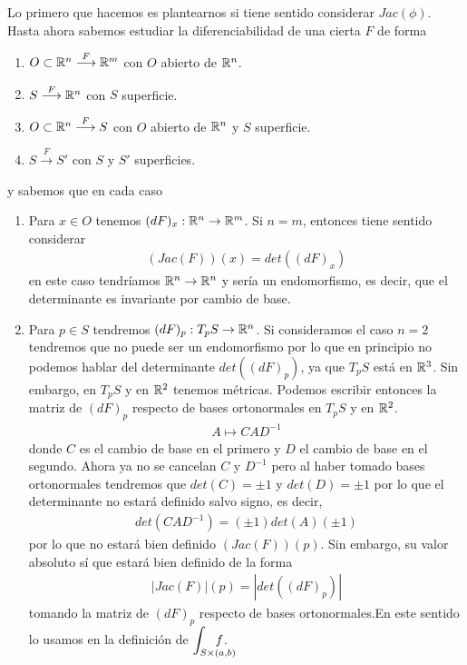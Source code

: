 \begin{observacion}
    Lo primero que hacemos es plantearnos si tiene sentido considerar $Jac(\phi)$. Hasta ahora sabemos estudiar la diferenciabilidad de una cierta $F$ de forma
    \begin{enumerate}
        \item $O \subset \mathbb{R}^n \overset{F}{\longrightarrow} \mathbb{R}^m$ con $O$ abierto de $\mathbb{R}^n$.
        \item $S \overset{F}{\longrightarrow} \mathbb{R}^n$ con $S$ superficie.
        \item $O \subset \mathbb{R}^n \overset{F}{\longrightarrow} S$ con $O$ abierto de $\mathbb{R}^n$ y $S$ superficie.
        \item $S \overset{F}{\longrightarrow} S'$ con $S$ y $S'$ superficies.
    \end{enumerate} 
    y sabemos que en cada caso
    \begin{enumerate}
        \item Para $x\in O$ tenemos $(dF)_x: \mathbb{R}^n \to \mathbb{R}^m$. Si $n=m$, entonces tiene sentido considerar
        \begin{gather*}
            (Jac(F))(x) = det((dF)_x)
        \end{gather*}
        en este caso tendríamos $\mathbb{R}^n \to \mathbb{R}^n$ y sería un endomorfismo, es decir, que el determinante es invariante por cambio de base.

        \item Para $p\in S$ tendremos $(dF)_p : T_pS \to \mathbb{R}^n$. Si consideramos el caso $n=2$ tendremos que no puede ser un endomorfismo por lo que en principio no podemos hablar del determinante $det((dF)_p)$, ya que $T_pS$ está en $\mathbb{R}^3$. Sin embargo, en $T_pS$ y en $\mathbb{R}^2$ tenemos métricas. Podemos escribir entonces la matriz de $(dF)_p$ respecto de bases ortonormales en $T_pS$ y en $\mathbb{R}^2$.
        \begin{gather*}
            A \mapsto C A D^{-1}
        \end{gather*}
        donde $C$ es el cambio de base en el primero y $D$ el cambio de base en el segundo. Ahora ya no se cancelan $C$ y $D^{-1}$ pero al haber tomado bases ortonormales tendremos que $det(C)=\pm 1$ y $det(D)=\pm 1$ por lo que el determinante no estará definido salvo signo, es decir,
        \begin{gather*}
            det(CAD^{-1}) = (\pm 1) det(A) (\pm 1)
        \end{gather*}
        por lo que no estará bien definido $(Jac(F))(p)$. Sin embargo, su valor absoluto sí que estará bien definido de la forma
        \begin{gather*}
            |Jac(F)|(p) = |det((dF)_p)|
        \end{gather*}
        tomando la matriz de $(dF)_p$ respecto de bases ortonormales.En este sentido lo usamos en la definición de $\displaystyle\int_{\mathrlap{S\times(a,b)}} \quad f$.
    \end{enumerate}
\end{observacion}


